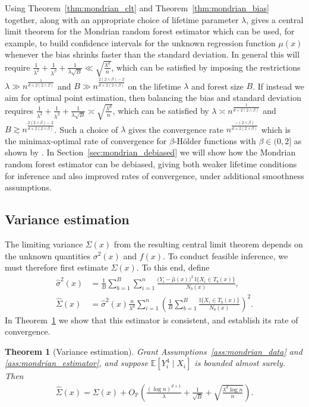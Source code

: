 \documentclass[11pt,lof]{puthesis}
\renewcommand{\P}{\ensuremath{\mathbb{P}}}
\newcommand{\E}{\ensuremath{\mathbb{E}}}
\newcommand{\I}{\ensuremath{\mathbb{I}}}
\theoremstyle{break}
\newtheorem{theorem}{Theorem}[section]
\theoremstyle{proof}
\begin{document}
Using Theorem~\ref{thm:mondrian_clt} and Theorem~\ref{thm:mondrian_bias}
together,
along with an appropriate choice of lifetime parameter $\lambda$,
gives a central limit theorem for the Mondrian random forest estimator
which can be used, for example, to build confidence intervals
for the unknown regression function $\mu(x)$
whenever the bias shrinks faster than the standard deviation.
In general this will require
$\frac{1}{\lambda^2} + \frac{1}{\lambda^\beta} + \frac{1}{\lambda \sqrt B}
\ll \sqrt{\frac{\lambda^d}{n}}$,
which can be satisfied by imposing the restrictions
$\lambda \gg n^{\frac{1}{d + 2(2 \wedge \beta)}}$
and $B \gg n^{\frac{2(2 \wedge \beta) - 2}{d + 2(2 \wedge \beta)}}$
on the lifetime $\lambda$ and forest size $B$.
If instead we aim for optimal point estimation,
then balancing the bias and standard deviation requires
$\frac{1}{\lambda^2} + \frac{1}{\lambda^\beta} + \frac{1}{\lambda \sqrt B}
\asymp \sqrt{\frac{\lambda^d}{n}}$,
which can be satisfied by
$\lambda \asymp n^{\frac{1}{d + 2(2 \wedge \beta)}}$
and $B \gtrsim n^{\frac{2(2 \wedge \beta) - 2}{d + 2(2 \wedge \beta)}}$.
Such a choice of $\lambda$ gives the convergence rate
$n^{\frac{-(2 \wedge \beta)}{d + 2(2 \wedge \beta)}}$
which is the minimax-optimal rate of convergence \citep{stone1982optimal}
for $\beta$-H{\"o}lder functions with $\beta \in (0,2]$
as shown by \citet[Theorem~2]{mourtada2020minimax}.
In Section~\ref{sec:mondrian_debiased} we will show how the Mondrian random
forest
estimator can be debiased, giving both weaker lifetime conditions for inference
and also improved rates of convergence, under additional smoothness assumptions.

\subsection*{Variance estimation}

The limiting variance $\Sigma(x)$ from the resulting central limit theorem
depends on the unknown quantities $\sigma^2(x)$ and $f(x)$.
To conduct feasible inference, we must therefore first estimate
$\Sigma(x)$. To this end, define
%
\begin{align}
\label{eq:mondrian_sigma2_hat}
\hat\sigma^2(x)
&=
\frac{1}{B} \sum_{b=1}^{B} \sum_{i=1}^n
\frac{\big(Y_i - \hat \mu(x)\big)^2 \, \I\{X_i \in T_b(x)\}} {N_b(x)}, \\
\nonumber
\hat\Sigma(x)
&=
\hat\sigma^2(x) \frac{n}{\lambda^d} \sum_{i=1}^n
\left( \frac{1}{B} \sum_{b=1}^B \frac{\I\{X_i \in T_b(x)\}}{N_b(x)} \right)^2.
\end{align}
%
In Theorem~\ref{thm:mondrian_variance_estimation} we show that this
estimator is consistent, and establish its rate of convergence.
%
\begin{theorem}[Variance estimation]%
\label{thm:mondrian_variance_estimation}
Grant Assumptions~\ref{ass:mondrian_data} and \ref{ass:mondrian_estimator},
and
suppose $\E[Y_i^4 \mid X_i ]$ is bounded almost surely. Then
%
\begin{align*}
\hat\Sigma(x)
= \Sigma(x)
+ O_\P \left(
\frac{(\log n)^{d+1}}{\lambda}
+ \frac{1}{\sqrt B} + \sqrt{\frac{\lambda^d \log n}{n}}
\right).
\end{align*}

\end{theorem}
\end{document}
